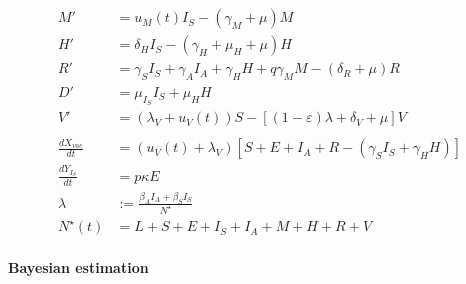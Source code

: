 \documentclass[a4paper,10pt]{amsart}
\begin{document}
\begin{equation}
\begin{aligned}
            \\
            M' &= 
                u_M(t) I_S - (\gamma_M + \mu ) M
            \\
            H' &= 
                \delta_H I_S - (\gamma_H + \mu_H + \mu) H 
            \\
            R'  &= 
                \gamma_S I_S + \gamma_A I_A + \gamma_H H + q \gamma_M M
                - (\delta_R + \mu) R
            \\
            D' &= 
                \mu_{I_S} I_S + \mu_H H
            \\
            V' &= 
                (\lambda_V + u_V(t)) S  
                - \left[
                	(1 - \varepsilon) \lambda
                	+ \delta_V
                	+ \mu
                \right ] V
            \\
            \\
            \frac{dX_{vac}}{dt}
            	&=
            	(u_V(t) + \lambda_V)
            	\left[
            		S + E + I_A + R - (\gamma_S I_S + \gamma_H H)  
            	\right]
            \\
            \frac{d Y_{I_S}}{dt}
            	& = p \kappa E
            \\
            \lambda &:=
                \frac{\beta_A I_A + \beta_S I_S}{N^{\star}}
            \\
            N^{\star}(t) &=
                L + S +E + I_S + I_A +
                M + H + R + V
        \end{aligned}
    \end{equation}
	
    \paragraph{Bayesian estimation}
    
\end{document}
